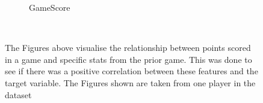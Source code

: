 \documentclass[a4paper,11pt,twoside]{article}
\begin{document}
\begin{figure} [h!]
{\begin{subfigure}[b]{.45\textwidth}
\caption{GameScore}
\end{subfigure}%
}\\
\caption{The Figures above visualise the relationship between points scored in a game and specific stats from the prior game. This was done to see if there was a positive correlation between these features and the target variable. The Figures shown are taken from one player in the dataset }
\end{figure}


\begin{figure} [h!]
\end{figure}
\end{document}
